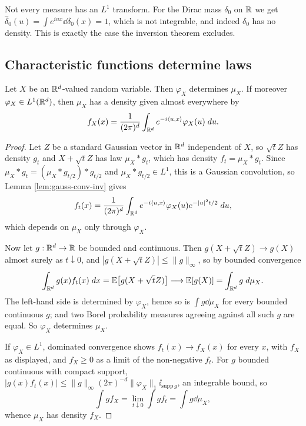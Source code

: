 \documentclass[a4paper]{scrartcl}
\newcommand{\ip}[2]{\langle #1, #2 \rangle}
\newcommand{\ind}{\ii}
\begin{document}
\begin{example}
	Not every measure has an $L^1$ transform. For the Dirac mass $\delta_0$ on $\mathbb{R}$ we get $\hat\delta_0(u)=\int e^{iux}\dd\delta_0(x)=1$, which is not integrable, and indeed $\delta_0$ has no density. This is exactly the case the inversion theorem excludes.
\end{example}

\subsection{Characteristic functions determine laws}

\begin{theorem}[Uniqueness]\label{thm:cf-unique}
	Let $X$ be an $\mathbb{R}^d$-valued random variable. Then $\varphi_X$ determines $\mu_X$. If moreover $\varphi_X \in L^1(\mathbb{R}^d)$, then $\mu_X$ has a density given almost everywhere by
	$$
	f_X(x)=\frac{1}{(2\pi)^d}\int_{\R^d}e^{-i\ip{u}{x}}\varphi_X(u)\dd u.
	$$
\end{theorem}
\begin{proof}
	Let $Z$ be a standard Gaussian vector in $\mathbb{R}^d$ independent of $X$, so $\sqrt tZ$ has density $g_t$ and $X+\sqrt tZ$ has law $\mu_X * g_t$, which has density $f_t = \mu_X*g_t$. Since $\mu_X*g_t=(\mu_X*g_{t/2})*g_{t/2}$ and $\mu_X * g_{t/2}\in L^1$, this is a Gaussian convolution, so Lemma \ref{lem:gauss-conv-inv} gives
	$$
	f_t(x) = \frac{1}{(2\pi)^d}\int_{\R^d}e^{-i\ip{u}{x}}\varphi_X(u)e^{-|u|^2t/2}\dd u,
	$$
	which depends on $\mu_X$ only through $\varphi_X$.

	Now let $g : \mathbb{R}^d\to\mathbb{R}$ be bounded and continuous. Then $g(X+\sqrt tZ)\to g(X)$ almost surely as $t\downarrow0$, and $|g(X+\sqrt tZ)|\leq\|g\|_\infty$, so by bounded convergence
	$$
	\int_{\mathbb{R}^d}g(x)f_t(x)\; d x = \mathbb{E}\big[g(X+\sqrt t Z)\big]\longrightarrow \mathbb{E}[g(X)]=\int_{\mathbb{R}^d}g\; d\mu_X.
	$$
	The left-hand side is determined by $\varphi_X$, hence so is $\int g\dd\mu_X$ for every bounded continuous $g$; and two Borel probability measures agreeing against all such $g$ are equal. So $\varphi_X$ determines $\mu_X$.

	If $\varphi_X \in L^1$, dominated convergence shows $f_t(x)\to f_X(x)$ for every $x$, with $f_X$ as displayed, and $f_X \geq 0$ as a limit of the non-negative $f_t$. For $g$ bounded continuous with compact support, $|g(x)f_t(x)|\leq\|g\|_\infty(2\pi)^{-d}\|\varphi_X\|_1\ind_{\mathrm{supp}\,g}$, an integrable bound, so
	$$
	\int g f_X = \lim_{t\downarrow0}\int gf_t = \int g\dd\mu_X,
	$$
	whence $\mu_X$ has density $f_X$.
\end{proof}
\end{document}
